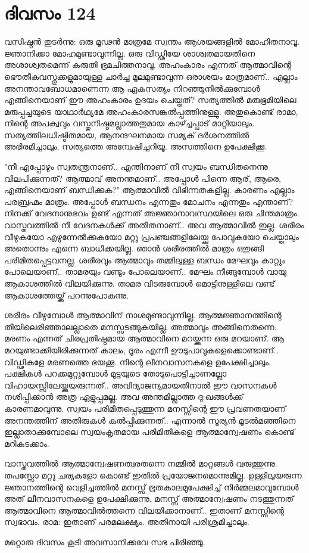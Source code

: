 \newpage
\section{ദിവസം 124}


വസിഷ്ഠന്‍ തുടര്‍ന്നു: ഒരു മൂഢന്‍ മാത്രമേ സ്വന്തം ആശയങ്ങളില്‍ മോഹിതനാവൂ. ജ്ഞാനിക്കാ മോഹമുണ്ടാവുന്നില്ല. ഒരു വിഡ്ഢിയേ ശാശ്വതമായതിനെ അശാശ്വതമെന്ന് കരുതി ഭ്രമചിത്തനാവൂ. അഹംകാരം എന്നത്‌ ആത്മാവിന്റെ ഭൌതീകവസ്തുക്കളുമായുള്ള ചാര്‍ച്ച മൂലമുണ്ടാവുന്ന ഒരാശയം മാത്രമാണ്‌.. എല്ലാം അനന്താവബോധമാണെന്ന ആ ഏകസത്യം നിറഞ്ഞുനില്‍ക്കുമ്പോള്‍ എങ്ങിനെയാണ്‌ ഈ അഹംകാരം ഉദയം ചെയ്തത്‌? സത്യത്തില്‍ മരുഭൂമിയിലെ മരുപ്പച്ചയുടെ യാഥാര്‍ഥ്യമേ അഹംകാരസങ്കല്‍പ്പത്തിനുള്ളു. അതുകൊണ്ട്‌ രാമാ, നിന്റെ അപക്വവും വസ്തുനിഷ്ഠമല്ലാത്തതുമായ കാഴ്ച്ചപ്പാട്‌ മാറ്റിയാലും. സത്യത്തിലധിഷ്ഠിതമായ, ആനന്ദഘനമായ സമ്യക്‌ ദര്‍ശനത്തില്‍ അഭിരമിച്ചാലും. സത്യത്തെ അന്വേഷിച്ചറിയൂ. അസത്തിനെ ഉപേക്ഷിക്കൂ.

"നീ എപ്പോഴും സ്വതന്ത്രനാണ്‌.. എന്തിനാണ്‌ നീ സ്വയം ബന്ധിതനെന്നു വിലപിക്കുന്നത്‌? ആത്മാവ്‌ അനന്തമാണ്‌.. അപ്പോള്‍ പിന്നെ ആര്‌, ആരെ, എങ്ങിനെയാണ്‌ ബന്ധിക്കുക?" ആത്മാവില്‍ വിഭിന്നതകളില്ല. കാരണം എല്ലാം പരബ്രഹ്മം മാത്രം. അപ്പോള്‍ ബന്ധനം എന്നതും മോചനം എന്നതും എന്താണ്‌? നിനക്ക്‌ വേദനാനുഭവം ഉണ്ട്‌ എന്നത്‌ അജ്ഞാനാവസ്ഥയിലെ ഒരു ചിന്തമാത്രം. വാസ്തവത്തില്‍ നീ വേദനകള്‍ക്ക്‌ അതീതനാണ്‌.. അവ ആത്മാവില്‍ ഇല്ല. ശരീരം വീഴുകയോ എഴുന്നേല്‍ക്കുകയോ മറ്റു പ്രപഞ്ചങ്ങളിലേയ്ക്കു പോവുകയോ ചെയ്താലും അതൊന്നും എന്നെ ബാധിക്കയില്ല. ഞാന്‍ ശരീരത്തില്‍ മാത്രം ഒതുങ്ങി പരിമിതപ്പെട്ടവനല്ല. ശരീരവും ആത്മാവും തമ്മിലുള്ള ബന്ധം മേഘവും കാറ്റും പോലെയാണ്‌.. താമരയും വണ്ടും പോലെയാണ്‌.. മേഘം നീങ്ങുമ്പോള്‍ വായു ആകാശത്തില്‍ വിലയിക്കുന്നു. താമര വിടരുമ്പോള്‍ മൊട്ടിനുള്ളിലെ വണ്ട്‌ ആകാശത്തേയ്ക്ക്‌ പറന്നുപോകുന്നു.

ശരീരം വീഴുമ്പോള്‍ ആത്മാവിന്‌ നാശമുണ്ടാവുന്നില്ല. ആത്മജ്ഞാനത്തിന്റെ തീയിലെരിഞ്ഞാലല്ലാതെ മനസ്സടങ്ങുകയില്ല. അത്മാവും അങ്ങിനെതന്നെ. മരണം എന്നത്‌ ചിരപ്രതിഷ്ഠമായ ആത്മാവിനെ മറയ്ക്കുന്ന ഒരു മറയാണ്‌. ആ മറയുണ്ടാക്കിയിരിക്കുന്നത്‌ കാലം, ദൂരം എന്നീ ഊടുപാവുകളെക്കൊണ്ടാണ്‌.. വിഡ്ഢികളേ മരണത്തെ ഭയക്കൂ. നിന്റെ ലീനവാസനകളെ ഉപേക്ഷിച്ചാലും. പക്ഷികള്‍ പറക്കമുറ്റുമ്പോള്‍ മുട്ടയുടെ തോടുപൊട്ടിച്ചാണല്ലോ വിഹായസ്സിലേയ്ക്കുയരുന്നത്‌.. അവിദ്യാജന്യമായതിനാല്‍ ഈ വാസനകള്‍ നശിപ്പിക്കാന്‍ അത്ര ഏളുപ്പമല്ല. അവ അന്തമില്ലാത്ത ദു:ഖങ്ങള്‍ക്ക്‌ കാരണമാവുന്നു. സ്വയം പരിമിതപ്പെടുത്തുന്ന മനസ്സിന്റെ ഈ പ്രവണതയാണ്‌ അനന്തത്തിന്‌ അതിരുകള്‍ കല്‍പ്പിക്കുന്നത്‌.. എന്നാല്‍ സൂര്യന്‍ മൂടല്‍മഞ്ഞിനെ ഇല്ലാതാക്കുമ്പോലെ സ്വയംകൃതമായ പരിമിതികളെ ആത്മാന്വേഷണം കൊണ്ട്‌ മറികടക്കാം.

വാസ്തവത്തില്‍ ആത്മാന്വേഷണത്വരതന്നെ നമ്മില്‍ മാറ്റങ്ങള്‍ വരുത്തുന്നു. തപസ്സോ മറ്റു ചര്യകളോ കൊണ്ട്‌ ഇതില്‍ പ്രയോജനമൊന്നുമില്ല. ഉള്ളിലുയരുന്ന ജ്ഞാനത്തിന്റെ വെളിച്ചത്തില്‍ മനസ്സ്‌ ഭൂതകാലമുപേക്ഷിച്ച്‌ നിര്‍മ്മലമാവുമ്പോള്‍ അത്‌ ലീനവാസനകളെ ഉപേക്ഷിക്കുന്നു. മനസ്സ്‌ അത്മാന്വേഷണം നടത്തുന്നത്‌ ആത്മാവിനെ ആത്മാവില്‍ത്തന്നെ വിലയിക്കാനാണ്‌.. ഇതാണ്‌ മനസ്സിന്റെ സ്വഭാവം. രാമ: ഇതാണ്‌ പരമലക്ഷ്യം. അതിനായി പരിശ്രമിച്ചാലും.

മറ്റൊരു ദിവസം കൂടി അവസാനിക്കവേ സഭ പിരിഞ്ഞു. 
